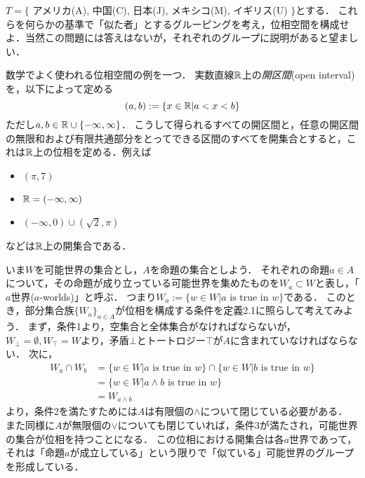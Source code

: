 \documentclass[11pt,a4paper, dvipdfmx]{jsarticle}
\begin{document}
\begin{exercise}
 $T = \{$ アメリカ(A), 中国(C), 日本(J), メキシコ(M), イギリス(U) $\}$とする．
これらを何らかの基準で「似た者」とするグルーピングを考え，位相空間を構成せよ．当然この問題には答えはないが，それぞれのグループに説明があると望ましい．
\end{exercise}


\begin{example}
\label{ex:real}
数学でよく使われる位相空間の例を一つ．
実数直線$\mathbb{R}$上の\emph{開区間}(open interval)を，以下によって定める
\[
  (a, b) := \{ x \in \mathbb{R}| a < x < b \}
\]
ただし$a, b \in \mathbb{R} \cup \{-\infty, \infty\}$．
こうして得られるすべての開区間と，任意の開区間の無限和および有限共通部分をとってできる区間のすべてを開集合とすると，これは$\mathbb{R}$上の位相を定める．例えば
\begin{itemize}
 \item $(\pi,7)$
 \item $\mathbb{R} = (-\infty, \infty)$
 \item $(-\infty, 0) \cup (\sqrt{2}, \pi)$ 
\end{itemize}
などは$\mathbb{R}$上の開集合である．
\end{example}


\begin{example}
\label{possibleworlds}
いま$W$を可能世界の集合とし，$A$を命題の集合としよう．
それぞれの命題$a \in A$について，その命題が成り立っている可能世界を集めたものを$W_a \subset W$と表し，「$a$世界($a$-worlds)」と呼ぶ．
つまり$W_a := \{ w \in W | a \text{ is true in } w \}$である．
このとき，部分集合族$\{ W_a \}_{a \in A}$が位相を構成する条件を定義2.1に照らして考えてみよう．
まず，条件1より，空集合と全体集合がなければならないが，$W_{\bot} = \emptyset, W_{\top}=W$より，矛盾$\bot$とトートロジー$\top$が$A$に含まれていなければならない．
次に，
\begin{align*}
W_a \cap W_b &=  \{ w \in W | a \text{ is true in } w \} \cap \{ w \in W | b \text{ is true in } w \} \\
&= \{ w \in W | a \wedge b \text{ is true in } w \} \\
&= W_{a \wedge b}
\end{align*}
より，条件2を満たすためには$A$は有限個の$\wedge$について閉じている必要がある．
また同様に$A$が無限個の$\vee$についても閉じていれば，条件3が満たされ，可能世界の集合が位相を持つことになる．
この位相における開集合は各$a$世界であって，それは「命題$a$が成立している」という限りで「似ている」可能世界のグループを形成している．
\end{example}
\end{document}
